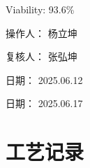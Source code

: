 \documentclass[UTF8,10pt,a4paper,fontset=fandol]{ctexart}
\newcommand{\fieldvalue}[1]{#1}
\newcommand{\handwritten}[1]{#1}
\begin{document}
\medskip

Viability:
\fieldvalue{93.6\%}

\bigskip

\noindent
\begin{minipage}[t]{0.46\linewidth}
\centering
\fbox{\rule{0pt}{1.7in}\rule{0.95\linewidth}{0pt}}
\end{minipage}
\hfill
\begin{minipage}[t]{0.46\linewidth}
\centering
\fbox{\rule{0pt}{1.7in}\rule{0.95\linewidth}{0pt}}
\end{minipage}

\vspace{0.7in}

\noindent
\begin{minipage}[t]{0.46\linewidth}
\centering
\fbox{\rule{0pt}{1.7in}\rule{0.95\linewidth}{0pt}}
\end{minipage}
\hfill
\begin{minipage}[t]{0.46\linewidth}
\centering
\fbox{\rule{0pt}{1.7in}\rule{0.95\linewidth}{0pt}}
\end{minipage}

\vfill

\noindent
操作人：
\fieldvalue{\handwritten{杨立坤}}

\noindent
复核人：
\fieldvalue{\handwritten{张弘坤}}

\hfill
\begin{minipage}[t]{0.38\linewidth}
日期：
\fieldvalue{\handwritten{2025.06.12}}

\medskip

日期：
\fieldvalue{\handwritten{2025.06.17}}
\end{minipage}

\newpage

\section*{工艺记录}
\end{document}
